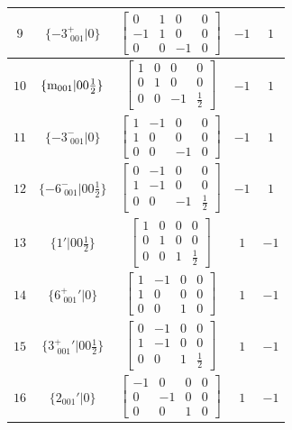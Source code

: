 \documentclass[fleqn,8pt]{jsarticle}
\begin{document}
\begin{longtable}{ccccc}
$ 9 $ & $ \{-3^{+}_{\,\,001}|0\} $ & $ \begin{bmatrix} 0 & 1 & 0 & 0 \\ -1 & 1 & 0 & 0 \\ 0 & 0 & -1 & 0 \end{bmatrix} $ & $ -1 $ & $ 1 $ \\ \hline
$ 10 $ & $ \{{\rm m}_{001}|0 0 \frac{1}{2}\} $ & $ \begin{bmatrix} 1 & 0 & 0 & 0 \\ 0 & 1 & 0 & 0 \\ 0 & 0 & -1 & \frac{1}{2} \end{bmatrix} $ & $ -1 $ & $ 1 $ \\ \hline
$ 11 $ & $ \{-3^{-}_{\,\,001}|0\} $ & $ \begin{bmatrix} 1 & -1 & 0 & 0 \\ 1 & 0 & 0 & 0 \\ 0 & 0 & -1 & 0 \end{bmatrix} $ & $ -1 $ & $ 1 $ \\ \hline
$ 12 $ & $ \{-6^{-}_{\,\,001}|0 0 \frac{1}{2}\} $ & $ \begin{bmatrix} 0 & -1 & 0 & 0 \\ 1 & -1 & 0 & 0 \\ 0 & 0 & -1 & \frac{1}{2} \end{bmatrix} $ & $ -1 $ & $ 1 $ \\ \hline
$ 13 $ & $ \{1{}'|0 0 \frac{1}{2}\} $ & $ \begin{bmatrix} 1 & 0 & 0 & 0 \\ 0 & 1 & 0 & 0 \\ 0 & 0 & 1 & \frac{1}{2} \end{bmatrix} $ & $ 1 $ & $ -1 $ \\ \hline
$ 14 $ & $ \{6^{+}_{\,\,001}{}'|0\} $ & $ \begin{bmatrix} 1 & -1 & 0 & 0 \\ 1 & 0 & 0 & 0 \\ 0 & 0 & 1 & 0 \end{bmatrix} $ & $ 1 $ & $ -1 $ \\ \hline
$ 15 $ & $ \{3^{+}_{\,\,001}{}'|0 0 \frac{1}{2}\} $ & $ \begin{bmatrix} 0 & -1 & 0 & 0 \\ 1 & -1 & 0 & 0 \\ 0 & 0 & 1 & \frac{1}{2} \end{bmatrix} $ & $ 1 $ & $ -1 $ \\ \hline
$ 16 $ & $ \{2{}_{001}{}'|0\} $ & $ \begin{bmatrix} -1 & 0 & 0 & 0 \\ 0 & -1 & 0 & 0 \\ 0 & 0 & 1 & 0 \end{bmatrix} $ & $ 1 $ & $ -1 $ \\ \hline

\end{longtable}
\end{document}
